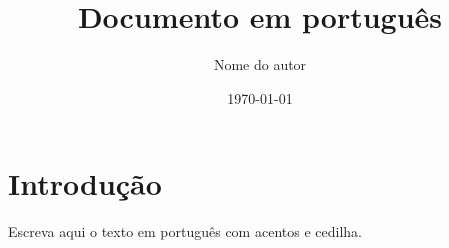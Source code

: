 \documentclass[11pt,a4paper]{article}
\title{Documento em português}
\author{Nome do autor}
\date{\today}
\begin{document}
\maketitle
\section{Introdução}
Escreva aqui o texto em português com acentos e cedilha.
\end{document}
